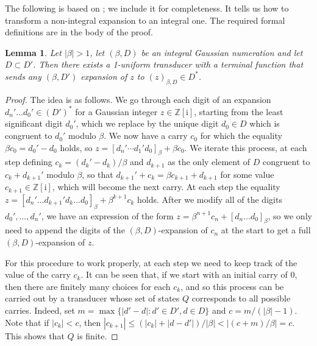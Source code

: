 \documentclass{amsart}
\newcommand{\Z}{\mathbb{Z}}
\newcommand{\tcr}{\textcolor{red}}
\newcommand{\ii}{\mathrm{i}}
\newtheorem*{main theorem}{Theorem \ref{thm:main-gaussian}}
\newtheorem{lemma}[theorem]{Lemma}
\theoremstyle{definition}
\begin{document}
 The following is based on \cite[Lemma 7.1.1]{Lothaire};
we include it for completeness. It tells us how to transform a non-integral expansion  to an integral one. The required formal definitions are in the body of the proof.
\begin{lemma}\label{lem:transducer}Let $|\beta|>1$,
    let $(\beta, D)$ be an integral Gaussian numeration and let $D\subset D'$. Then there exists a 1-uniform transducer with a terminal function that sends %
    any $(\beta, D')$ expansion of $z$  to $(z)_{\beta,D}\in D^*$.
\end{lemma}
\begin{proof}
The idea is as follows. We go through each digit of an expansion $d_n'\dotsc d_0'\in (D')^*$ for a Gaussian integer $z\in\Z[\ii]$, starting from the least significant digit $d_0'$, which we replace by the unique digit $d_0\in D$ which is congruent to $d_0'$ modulo $\beta$. We now have a carry $c_0$ for which the equality $\beta c_0=d_0'-d_0$ holds, so $z=[d_n'\cdots d_1'd_0]_\beta + \beta c_0$. We iterate this process, at each step defining $c_k=(d_k'-d_k)/\beta$ and $d_{k+1}$ as the only element of $D$ congruent to $c_{k}+d_{k+1}'$  modulo $\beta$, so that $d_{k+1}'+c_k=\beta c_{k+1} + d_{k+1}$ for some value $c_{k+1}\in\Z[\ii]$, which will become the next carry. At each step the equality $z=[d_n'\dotsc d_{k+1}'d_k\dotsc d_0]_\beta + \beta^{k+1} c_k$ holds. After we modify all of the digits $d_0',\dotsc,d_n'$, we have an expression of the form $z= \beta^{n+1} c_n+[d_n\dotsc d_0]_\beta$, so we only need to append the digits of the $(\beta,D)$-expansion of $c_n$ at the start to get a full $(\beta,D)$-expansion of $z$.

For this procedure to work properly, at each step we need to keep track of the value of the carry $c_k$. It can be seen that, if we start with an initial carry of $0$, then there are finitely many choices for each $c_k$, and so this process can be carried out by a transducer whose set of states $Q$ corresponds to all possible carries. Indeed, set $m=\max\{\lvert d'-d\rvert : d'\in D',d\in D\}$ and $c=m/(|\beta|-1)$. Note that if $|c_k|<c$, then $|c_{k+1}|\leq (|c_k|+|d-d'|)/|\beta|< \left|(c+m)/\beta \right|= c$. This shows that  $Q$ is finite.



\end{proof}
\end{document}
